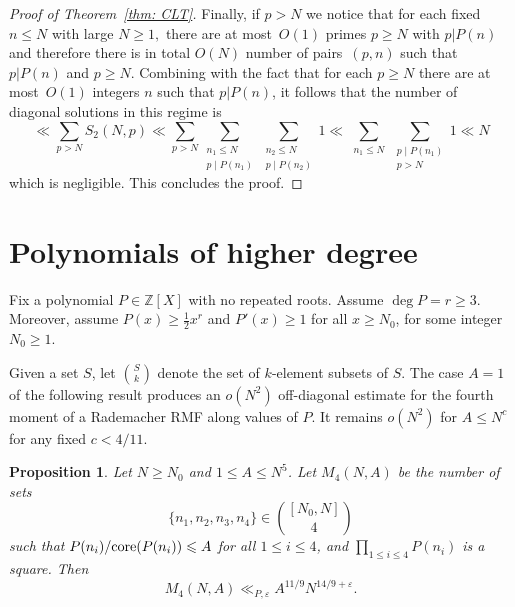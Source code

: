 \documentclass[reqno, 12pt]{amsart}
\theoremstyle{plain}
\newtheorem{proposition}[theorem]{Proposition}
\theoremstyle{definition}
\theoremstyle{remark}
\renewcommand{\le}{\leqslant}
\renewcommand{\ge}{\geqslant}
\renewcommand{\leq}{\leqslant}
\newcommand{\co}{\textnormal{core}}
\begin{document}
\begin{proof}[Proof of Theorem~\ref{thm: CLT}]
Finally, if $p> N$ we notice that for each fixed $n\le N$ with large $N\ge 1,$ there are at most~$O (1)$ primes $p\ge N$ with $p\vert P(n)$ and therefore there is in total $O (N)$ number of pairs~$(p,n)$ such that $p\vert P(n)$ and $p\ge N$. Combining with the fact that for each $p\ge N$ there are at most~$O (1)$ integers $n$ such that $p\vert P(n)$, it follows that the number of diagonal solutions in this regime is  $$\ll\sum_{p>N} S_2(N,p)\ll \sum_{p>N}\sum_{\substack{n_1\leq N\\ p\mid P(n_1) }}\sum_{\substack{n_2\leq N\\ p\mid P(n_2)}}1\ll \sum_{\substack{n_1\leq N }}\sum_{\substack{p\mid P(n_1)\\  p>N}}1\ll N$$ which is negligible. This concludes the proof.
\end{proof}













\section{Polynomials of higher degree}

Fix a polynomial $P\in \mathbb{Z}[X]$ with no repeated roots.
Assume $\deg{P} = r \ge 3$.
Moreover, assume $P(x)\ge \frac12 x^r$ and $P'(x)\ge 1$ for all $x\ge N_0$,
for some integer $N_0\ge 1$.

 Given a set $S$, let $\binom{S}{k}$ denote the set of $k$-element subsets of $S$.
The case $A=1$ of the following result
produces an $o(N^2)$ off-diagonal estimate
for the fourth moment of a Rademacher RMF along values of $P$.
It remains $o(N^2)$ for $A\le N^c$ for any fixed $c<4/11$.

\begin{proposition}
\label{unconditional-Rademacher-off-diagonal}
Let $N\ge N_0$ and $1\le A\le N^5$.
Let $M_4(N,A)$ be the number of sets
$$\{n_1,n_2,n_3,n_4\}\in \binom{[N_0,N]}{4}$$
such that $P(n_i)/\co(P(n_i)) \le A$ for all $1\le i\le 4$,
and $\prod_{1\le i\le 4} P(n_i)$ is a square.
Then
$$M_4(N,A) \ll_{P,\varepsilon} A^{11/9} N^{14/9+\varepsilon}.$$
\end{proposition}
\end{document}
